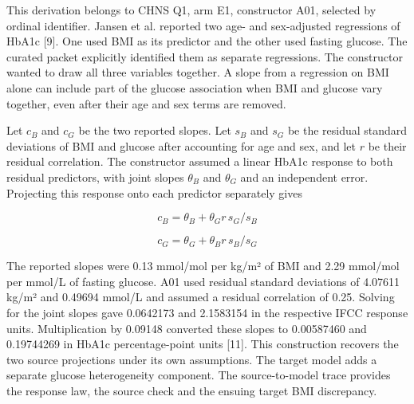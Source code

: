 \documentclass[sigconf,review]{acmart}
\begin{document}
This derivation belongs to CHNS Q1, arm E1, constructor A01, selected by ordinal identifier. Jansen et al. reported two age- and sex-adjusted regressions of HbA1c [9]. One used BMI as its predictor and the other used fasting glucose. The curated packet explicitly identified them as separate regressions. The constructor wanted to draw all three variables together. A slope from a regression on BMI alone can include part of the glucose association when BMI and glucose vary together, even after their age and sex terms are removed.


Let \(c_B\) and \(c_G\) be the two reported slopes. Let \(s_B\) and \(s_G\) be the residual standard deviations of BMI and glucose after accounting for age and sex, and let \(r\) be their residual correlation. The constructor assumed a linear HbA1c response to both residual predictors, with joint slopes \(\theta_B\) and \(\theta_G\) and an independent error. Projecting this response onto each predictor separately gives


\[
c_B = \theta_B + \theta_G r\,s_G/s_B
\]

\[
c_G = \theta_G + \theta_B r\,s_B/s_G
\]

The reported slopes were 0.13 mmol/\allowbreak{}mol per kg/\allowbreak{}m² of BMI and 2.29 mmol/\allowbreak{}mol per mmol/\allowbreak{}L of fasting glucose. A01 used residual standard deviations of 4.07611 kg/\allowbreak{}m² and 0.49694 mmol/\allowbreak{}L and assumed a residual correlation of 0.25. Solving for the joint slopes gave 0.0642173 and 2.1583154 in the respective IFCC response units. Multiplication by 0.09148 converted these slopes to 0.00587460 and 0.19744269 in HbA1c percentage-point units [11]. This construction recovers the two source projections under its own assumptions. The target model adds a separate glucose heterogeneity component. The source-to-model trace provides the response law, the source check and the ensuing target BMI discrepancy.
\end{document}
